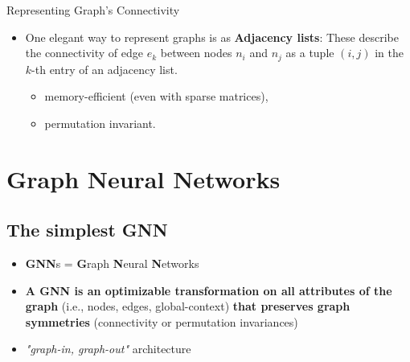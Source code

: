 \documentclass[
    11pt, %
    aspectratio=169, %
]{beamer}
\begin{document}
\begin{frame}{Representing Graph's Connectivity}
    \begin{itemize}
        \item One elegant way to represent graphs is as \textbf{Adjacency lists}: These describe the connectivity of edge $e_k$ between nodes $n_i$ and $n_j$ as a tuple $(i,j)$ in the $k$-th entry of an adjacency list.
        \begin{itemize}
            \item memory-efficient (even with sparse matrices),
            \item permutation invariant.
        \end{itemize}
    \end{itemize}
\end{frame}


\section{Graph Neural Networks}
\subsection{The simplest GNN}
\begin{frame}{}
    \begin{itemize}
        \item \textbf{GNN}s = \textbf{G}raph \textbf{N}eural \textbf{N}etworks
        \item \textbf{A GNN is an optimizable transformation on all attributes of the graph }(i.e., nodes, edges, global-context) \textbf{that preserves graph symmetries} (connectivity or permutation invariances)
        \item \textit{"graph-in, graph-out"} architecture
    \end{itemize}
\end{frame}
\end{document}
